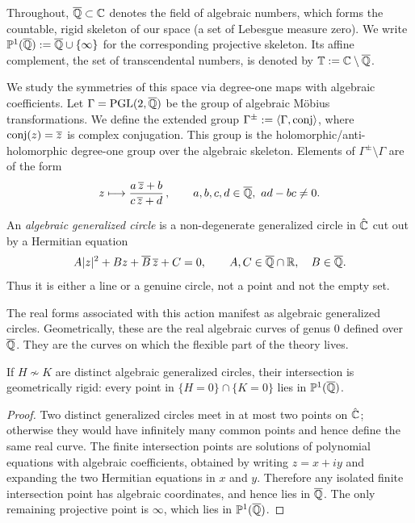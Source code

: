 Throughout, $\overline{\mathbb{Q}}\subset\mathbb{C}$ denotes the field of algebraic numbers, which forms the countable, rigid skeleton of our space (a set of Lebesgue measure zero). We write $\mathbb{P}^{1}(\overline{\mathbb{Q}}):=\overline{\mathbb{Q}}\cup\{\infty\}$ for the corresponding projective skeleton. Its affine complement, the set of transcendental numbers, is denoted by $\mathbb{T}:=\mathbb{C}\setminus\overline{\mathbb{Q}}$.

We study the symmetries of this space via degree-one maps with algebraic coefficients. Let $\Gamma=\operatorname{PGL}(2,\overline{\mathbb{Q}})$ be the group of algebraic M\"obius transformations. We define the extended group $\Gamma^{\pm}:=\langle \Gamma,\mathrm{conj}\rangle$, where $\mathrm{conj}(z)=\overline{z}$ is complex conjugation. This group is the holomorphic/anti-holomorphic degree-one group over the algebraic skeleton. Elements of $\Gamma^{\pm}\setminus\Gamma$ are of the form
\[
	z \longmapsto \frac{a\,\overline{z}+b}{c\,\overline{z}+d}\,,\qquad a,b,c,d\in\Alg,\ ad-bc\neq 0.
\]

\begin{definition}\label{grct:def:alg-generalized-circle}
	An \emph{algebraic generalized circle} is a non-degenerate generalized circle in $\hat{\mathbb{C}}$ cut out by a Hermitian equation
	\[
		A|z|^2+Bz+\overline B\,\overline z+C=0,
		\qquad A,C\in\overline{\mathbb{Q}}\cap\mathbb{R},\quad B\in\overline{\mathbb{Q}}.
	\]
	Thus it is either a line or a genuine circle, not a point and not the empty set.
\end{definition}

The real forms associated with this action manifest as algebraic generalized circles. Geometrically, these are the real algebraic curves of genus $0$ defined over $\overline{\mathbb{Q}}$. They are the curves on which the flexible part of the theory lives.

\begin{lemma}\label{grct:lem:alg-intersection}
	If $H\not\sim K$ are distinct algebraic generalized circles, their intersection is geometrically rigid: every point in $\{H=0\}\cap\{K=0\}$ lies in $\mathbb{P}^{1}(\overline{\mathbb{Q}})$.
\end{lemma}
\begin{proof}
	Two distinct generalized circles meet in at most two points on $\hat{\mathbb{C}}$; otherwise they would have infinitely many common points and hence define the same real curve. The finite intersection points are solutions of polynomial equations with algebraic coefficients, obtained by writing $z=x+iy$ and expanding the two Hermitian equations in $x$ and $y$. Therefore any isolated finite intersection point has algebraic coordinates, and hence lies in $\overline{\mathbb{Q}}$. The only remaining projective point is $\infty$, which lies in $\mathbb{P}^{1}(\overline{\mathbb{Q}})$.
\end{proof}

